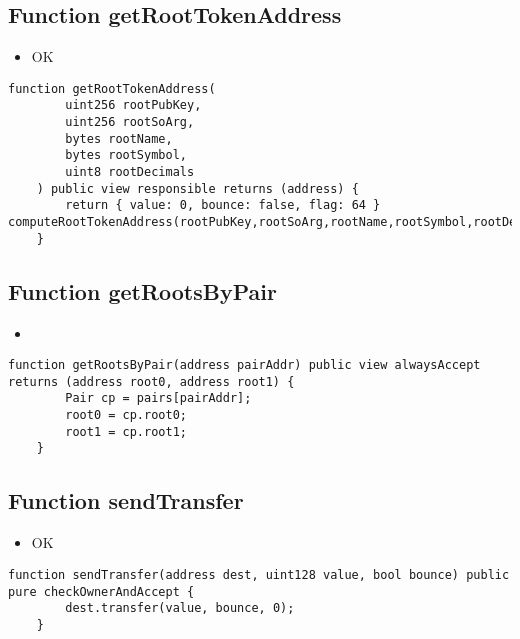 \subsection{Function getRootTokenAddress}

\begin{itemize}
\item OK
\end{itemize}

\begin{lstlisting}[firstnumber=213]
	function getRootTokenAddress(
		uint256 rootPubKey,
		uint256 rootSoArg,
		bytes rootName,
		bytes rootSymbol,
		uint8 rootDecimals
	) public view responsible returns (address) {
		return { value: 0, bounce: false, flag: 64 } computeRootTokenAddress(rootPubKey,rootSoArg,rootName,rootSymbol,rootDecimals);
	}
\end{lstlisting}

\subsection{Function getRootsByPair}

\begin{itemize}
\item {}
\end{itemize}

\begin{lstlisting}[firstnumber=322]
	function getRootsByPair(address pairAddr) public view alwaysAccept returns (address root0, address root1) {
		Pair cp = pairs[pairAddr];
		root0 = cp.root0;
		root1 = cp.root1;
	}
\end{lstlisting}

\subsection{Function sendTransfer}

\begin{itemize}
\item OK
\end{itemize}

\begin{lstlisting}[firstnumber=71]
	function sendTransfer(address dest, uint128 value, bool bounce) public pure checkOwnerAndAccept {
		dest.transfer(value, bounce, 0);
	}
\end{lstlisting}

